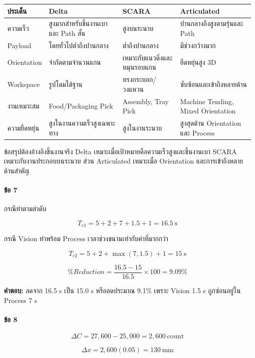 \begin{table}[htbp]
    \centering
    \begin{tabular}{l l l l}
        \hline
        \textbf{ประเด็น} & \textbf{Delta} & \textbf{SCARA} & \textbf{Articulated} \\
        \hline
        ความเร็ว & สูงมากสำหรับชิ้นงานเบาและ Path สั้น & สูงบนระนาบ & ปานกลางถึงสูงตามรุ่นและ Path \\
        Payload & โดยทั่วไปต่ำถึงปานกลาง & ต่ำถึงปานกลาง & มีช่วงกว้างมาก \\
        Orientation & จำกัดตามจำนวนแกน & เหมาะกับแนวดิ่งและหมุนรอบแกน & ยืดหยุ่นสูง 3D \\
        Workspace & รูปโดมใต้ฐาน & ทรงกระบอก/วงแหวน & ซับซ้อนและเข้าถึงหลายด้าน \\
        งานเหมาะสม & Food/Packaging Pick & Assembly, Tray Pick & Machine Tending, Mixed Orientation \\
        ความยืดหยุ่น & สูงในงานความเร็วสูงเฉพาะทาง & สูงในงานระนาบ & สูงสุดด้าน Orientation และ Process \\
        \hline
    \end{tabular}
\end{table}

ข้อสรุปต้องอ้างอิงชิ้นงานจริง Delta เหมาะเมื่อเป้าหมายคือความเร็วสูงและชิ้นงานเบา SCARA เหมาะกับงานประกอบบนระนาบ ส่วน Articulated เหมาะเมื่อ Orientation และการเข้าถึงหลายด้านสำคัญ

\paragraph{ข้อ 7}

กรณีทำตามลำดับ

\[
T_{c1}=5+2+7+1.5+1=16.5\ \text{s}
\]

กรณี Vision ทำพร้อม Process เวลาช่วงขนานเท่ากับค่าที่มากกว่า

\[
T_{c2}=5+2+\max(7,1.5)+1=15\ \text{s}
\]

\[
\%Reduction=\frac{16.5-15}{16.5}\times100=9.09\%
\]

\textbf{คำตอบ:} ลดจาก 16.5 s เป็น 15.0 s หรือลดประมาณ 9.1\% เพราะ Vision 1.5 s ถูกซ่อนอยู่ใน Process 7 s

\paragraph{ข้อ 8}

\[
\Delta C=27{,}600-25{,}000=2{,}600\ \text{count}
\]

\[
\Delta x=2{,}600(0.05)=130\ \text{mm}
\]

